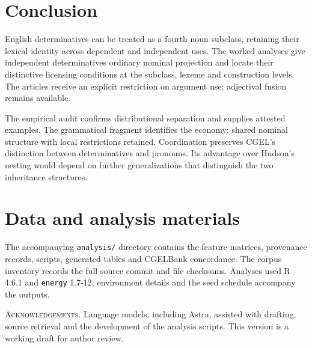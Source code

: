 \documentclass[12pt]{article}
\begin{document}
\section{Conclusion}\label{sec:conclusion}

English determinatives can be treated as a fourth noun subclass, retaining their lexical identity across dependent and independent uses. The worked analyses give independent determinatives ordinary nominal projection and locate their distinctive licensing conditions at the subclass, lexeme and construction levels. The articles receive an explicit restriction on argument use; adjectival fusion remains available.

The empirical audit confirms distributional separation and supplies attested examples. The grammatical fragment identifies the economy: shared nominal structure with local restrictions retained. Coordination preserves CGEL's distinction between determinatives and pronouns. Its advantage over Hudson's nesting would depend on further generalizations that distinguish the two inheritance structures.

\section*{Data and analysis materials}

The accompanying \texttt{analysis/} directory contains the feature matrices, provenance records, scripts, generated tables and CGELBank concordance. The corpus inventory records the full source commit and file checksums. Analyses used R 4.6.1 and \texttt{energy} 1.7-12; environment details and the seed schedule accompany the outputs.

\vspace{0.5\baselineskip}
\noindent\textsc{Acknowledgements.} Language models, including Astra, assisted with drafting, source retrieval and the development of the analysis scripts. This version is a working draft for author review.

\clearpage
\printbibliography
\end{document}
